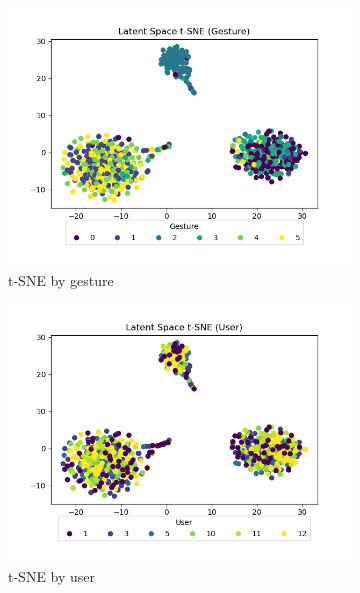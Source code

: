 \begin{figure}
	\centering
	\begin{subfigure}{0.3\textwidth}
		\centering
		\includegraphics[width=\textwidth]{figures/mtf-ppo-one/ls-gesture}
		\caption{t-SNE by gesture}
		\label{fig:mtf-ppo-one-ls-gesture}
	\end{subfigure}
	\hfill
	\begin{subfigure}{0.3\textwidth}
		\centering
		\includegraphics[width=\textwidth]{figures/mtf-ppo-one/ls-user}
		\caption{t-SNE by user}
		\label{fig:mtf-ppo-one-ls-user}
	\end{subfigure}
	\hfill
	\begin{subfigure}{0.3\textwidth}
		\centering

\end{subfigure}
\end{figure}
